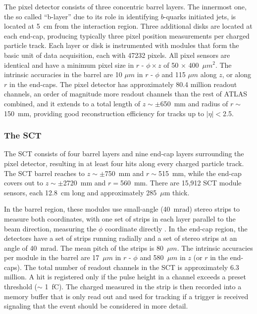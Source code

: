 The pixel detector consists of three concentric barrel layers. The innermost one, the so called ``b-layer'' due to its role in identifying $b$-quarks initiated jets, is located at 5~cm from the interaction region. Three additional disks are located at each end-cap, producing typically three pixel position measurements per charged particle track.  Each layer or disk is instrumented with modules that form the basic unit of data acquisition, each with 47232 pixels.  All pixel sensors are identical and have a minimum pixel size in $r$ - $\phi \times z$ of 50 $\times$ 400~$\mu m^2$. The intrinsic accuracies in the barrel are 10 $\mu m$ in $r$ - $\phi$ and 115 $\mu m$ along $z$, or along $r$ in the end-caps. The pixel detector has approximately 80.4 million readout channels, an order of magnitude more readout channels than the rest of ATLAS combined, and it extends to a total length of $z \sim \pm$650~mm and radius of $r \sim$150~mm, providing good reconstruction efficiency for tracks up to $|\eta| <$2.5.

 
\subsubsection{The SCT}


The SCT consists of four barrel layers and nine end-cap layers surrounding the pixel detector, resulting in at least four hits along every charged particle track.  The SCT barrel reaches to $z\sim \pm$750~mm and $r \sim $515~mm, while the end-cap covers out to $z\sim \pm$2720~mm and $r =$560~mm.  There are 15,912 SCT module sensors, each 12.8~cm long and approximately 285~$\mu $m thick. 

In the barrel region, these modules use small-angle (40~mrad) stereo strips to measure both coordinates, with one set of strips in each layer parallel to the beam direction, measuring the $\phi$ coordinate directly . In the end-cap region, the detectors have a set of strips running radially and a set of stereo strips at an angle of 40~mrad. The mean pitch of the strips is 80~$\mu m$. The intrinsic accuracies per module in the barrel are 17~$\mu m$ in $r$ - $\phi $ and 580~$\mu m$ in $z$ (or $r$ in the end-caps). The total number of readout channels in the SCT is approximately 6.3 million.  A hit is registered only if the pulse height in a channel exceeds a preset threshold ($\sim $ 1~fC). The charged measured in the strip is then recorded into a memory buffer that is only read out and used for tracking if a trigger is received signaling that the event should be considered in more detail.


